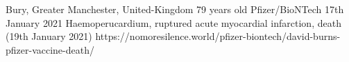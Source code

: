           {Bury, Greater Manchester, United-Kingdom}
          {79 years old}
          {Pfizer/BioNTech}
          {17th January 2021}
          {Haemoperucardium, ruptured acute myocardial infarction, death (19th January 2021)}
          {https://nomoresilence.world/pfizer-biontech/david-burns-pfizer-vaccine-death/}

